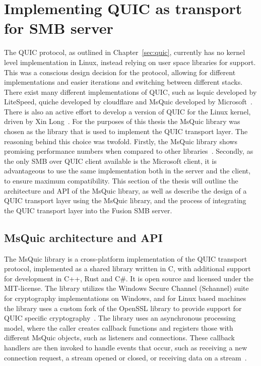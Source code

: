 \documentclass[english, 12pt, a4paper, elec, utf8, a-2b, online]{aaltothesis}
\begin{document}
\section{Implementing QUIC as transport for SMB server}
\label{sec:implementation}
The QUIC protocol, as outlined in Chapter~\ref{sec:quic}, currently has no kernel
level implementation in Linux, instead relying on user space libraries for support.
This was a conscious design decision for the protocol, allowing for different
implementations and easier iterations and switching between different stacks.
There exist many different implementations of QUIC, such as lsquic developed by
LiteSpeed, quiche developed by cloudflare and MsQuic developed by Microsoft~\cite{quic_implementations}.
There is also an active effort to develop a version of QUIC for the Linux kernel,
driven by Xin Long~\cite{quic_linux_kernel}. For the purposes of this thesis the
MsQuic library was chosen as the library that is used to implement the QUIC transport
layer. The reasoning behind this choice was twofold. Firstly, the MsQuic library
shows promising performance numbers when compared to other libraries~\cite{quic_perf}.
Secondly, as the only SMB over QUIC client available is the Microsoft client, it is
advantageous to use the same implementation both in the server and the client,
to ensure maximum compatibility. This section of the thesis will outline the
architecture and API of the MsQuic library, as well as describe the design of
a QUIC transport layer using the MsQuic library, and the process of integrating
the QUIC transport layer into the Fusion SMB server.

\subsection{MsQuic architecture and API}
\label{sec:msquic}
The MsQuic library is a cross-platform implementation of the QUIC transport protocol,
implemented as a shared library written in C, with additional support for development
in C++, Rust and C\#. It is open source and licensed under the MIT-license. The library
utilizes the Windows Secure Channel (Schannel) suite for cryptography implementations
on Windows, and for Linux based machines the library uses a custom fork of the
OpenSSL library to provide support for QUIC specific cryptography~\cite{msquic}. The
library uses an asynchronous processing model, where the caller creates callback functions
and registers those with different MsQuic objects, such as listeners and connections.
These callback handlers are then invoked to handle events that occur, such as receiving
a new connection request, a stream opened or closed, or receiving data on a stream~\cite{msquic_docs}. 
\end{document}
